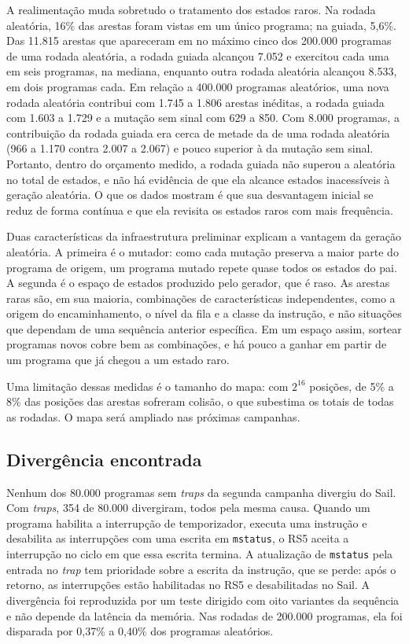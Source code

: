 A realimentação muda sobretudo o tratamento dos estados raros. Na rodada aleatória, 16\% das arestas foram vistas em um único programa; na guiada, 5,6\%. Das 11.815 arestas que apareceram em no máximo cinco dos 200.000 programas de uma rodada aleatória, a rodada guiada alcançou 7.052 e exercitou cada uma em seis programas, na mediana, enquanto outra rodada aleatória alcançou 8.533, em dois programas cada. Em relação a 400.000 programas aleatórios, uma nova rodada aleatória contribui com 1.745 a 1.806 arestas inéditas, a rodada guiada com 1.603 a 1.729 e a mutação sem sinal com 629 a 850. Com 8.000 programas, a contribuição da rodada guiada era cerca de metade da de uma rodada aleatória (966 a 1.170 contra 2.007 a 2.067) e pouco superior à da mutação sem sinal. Portanto, dentro do orçamento medido, a rodada guiada não superou a aleatória no total de estados, e não há evidência de que ela alcance estados inacessíveis à geração aleatória. O que os dados mostram é que sua desvantagem inicial se reduz de forma contínua e que ela revisita os estados raros com mais frequência.

Duas características da infraestrutura preliminar explicam a vantagem da geração aleatória. A primeira é o mutador: como cada mutação preserva a maior parte do programa de origem, um programa mutado repete quase todos os estados do pai. A segunda é o espaço de estados produzido pelo gerador, que é raso. As arestas raras são, em sua maioria, combinações de características independentes, como a origem do encaminhamento, o nível da fila e a classe da instrução, e não situações que dependam de uma sequência anterior específica. Em um espaço assim, sortear programas novos cobre bem as combinações, e há pouco a ganhar em partir de um programa que já chegou a um estado raro.

Uma limitação dessas medidas é o tamanho do mapa: com $2^{16}$ posições, de 5\% a 8\% das posições das arestas sofreram colisão, o que subestima os totais de todas as rodadas. O mapa será ampliado nas próximas campanhas.

\subsection{Divergência encontrada}\label{sec:previo-bug}

Nenhum dos 80.000 programas sem \textit{traps} da segunda campanha divergiu do Sail. Com \textit{traps}, 354 de 80.000 divergiram, todos pela mesma causa. Quando um programa habilita a interrupção de temporizador, executa uma instrução e desabilita as interrupções com uma escrita em \texttt{mstatus}, o RS5 aceita a interrupção no ciclo em que essa escrita termina. A atualização de \texttt{mstatus} pela entrada no \textit{trap} tem prioridade sobre a escrita da instrução, que se perde: após o retorno, as interrupções estão habilitadas no RS5 e desabilitadas no Sail. A divergência foi reproduzida por um teste dirigido com oito variantes da sequência e não depende da latência da memória. Nas rodadas de 200.000 programas, ela foi disparada por 0,37\% a 0,40\% dos programas aleatórios.

